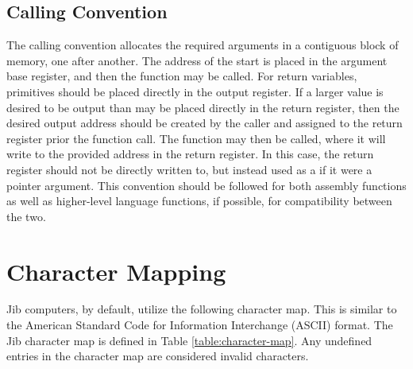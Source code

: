 \documentclass{article}
\begin{document}
\subsection{Calling Convention}

The calling convention allocates the required arguments in a contiguous block of memory, one after another. The address of the start is placed in the argument base register, and then the function may be called. For return variables, primitives should be placed directly in the output register. If a larger value is desired to be output than may be placed directly in the return register, then the desired output address should be created by the caller and assigned to the return register prior the function call. The function may then be called, where it will write to the provided address in the return register. In this case, the return register should not be directly written to, but instead used as a if it were a pointer argument. This convention should be followed for both assembly functions as well as higher-level language functions, if possible, for compatibility between the two.

\pagebreak

\section{Character Mapping}
\label{sec:character-map}

Jib computers, by default, utilize the following character map. This is similar to the American Standard Code for Information Interchange (ASCII) format. The Jib character map is defined in Table \ref{table:character-map}. Any undefined entries in the character map are considered invalid characters.

\newcommand{\charmap}[1]{\texttt{#1}}

\newcommand{\charslash}{\texttt{\char`\\}}

\newcommand{\charmapescape}[1]{\charmap{\texttt{\charslash#1}}}
\end{document}
